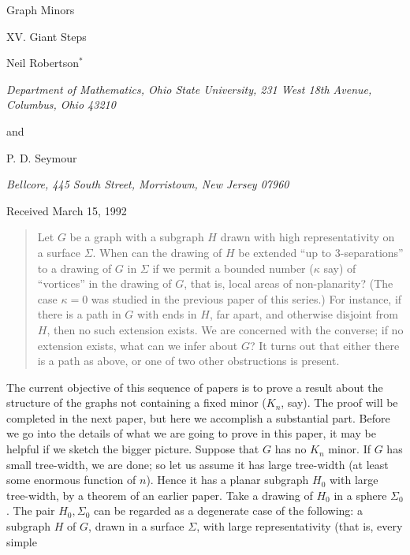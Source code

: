 {\centering
{\Large Graph Minors\par}
{\large XV. Giant Steps\par}\medskip

Neil Robertson$^*$\par
\textit{Department of Mathematics, Ohio State University, 231 West 18th Avenue, Columbus, Ohio 43210}\par
and\par
P. D. Seymour\par
\textit{Bellcore, 445 South Street, Morristown, New Jersey 07960}\par
Received March 15, 1992\par
}
\begin{quote}
Let $G$ be a graph with a subgraph $H$ drawn with high representativity on a surface $\Sigma$. When can the drawing of $H$ be extended ``up to 3-separations'' to a drawing of $G$ in $\Sigma$ if we permit a bounded number ($\kappa$ say) of ``vortices'' in the drawing of $G$, that is, local areas of non-planarity? (The case $\kappa = 0$ was studied in the previous paper of this series.) For instance, if there is a path in $G$ with ends in $H$, far apart, and otherwise disjoint from $H$, then no such extension exists. We are concerned with the converse; if no extension exists, what can we infer about $G$? It turns out that either there is a path as above, or one of two other obstructions is present.
\end{quote}


The current objective of this sequence of papers is to prove a result about the structure of the graphs not containing a fixed minor ($K_n$, say). The proof will be completed in the next paper, but here we accomplish a substantial part. Before we go into the details of what we are going to prove in this paper, it may be helpful if we sketch the bigger picture. Suppose that $G$ has no $K_n$ minor. If $G$ has small tree-width, we are done; so let us assume it has large tree-width (at least some enormous function of $n$). Hence it has a planar subgraph $H_0$ with large tree-width, by a theorem of an earlier paper. Take a drawing of $H_0$ in a sphere $\Sigma_0$. The pair $H_0, \Sigma_0$ can be regarded as a degenerate case of the following: a subgraph $H$ of $G$, drawn in a surface $\Sigma$, with large representativity (that is, every simple%
